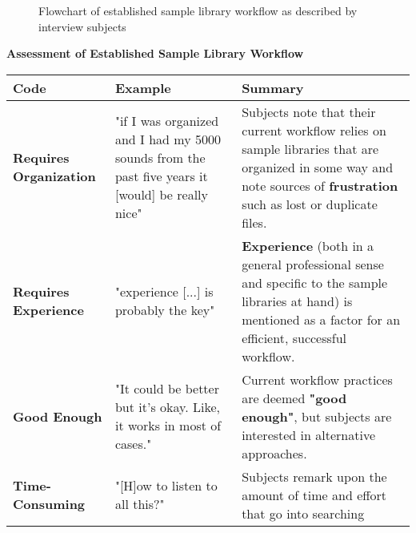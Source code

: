 \begin{figure}[!htb]
\caption[Established sample library workflow]{Flowchart of established sample
library workflow as described by interview subjects}
\label{table:results_current_workflow}
\end{figure}

\begin{table}[!ht]
  \textbf{Assessment of Established Sample Library Workflow}
  \renewcommand{\arraystretch}{1.2}
  \centering
  \footnotesize
  \begin{tabular}{ p{4.0cm} p{4.75cm} p{4.75cm} }
  \hline
    \textbf{Code} & \textbf{Example} & \textbf{Summary} \\
    \hline
    \textbf{Requires Organization}
    &
    "if I was organized and I had my 5000 sounds from the past five years it
    [would] be really nice"
    &
    Subjects note that their current workflow relies on sample libraries that
    are organized in some way and note sources of \textbf{frustration} such as
    lost or duplicate files.
    \\
    \textbf{Requires Experience}
    &
    "experience [...] is probably the key"
    &
    \textbf{Experience} (both in a general professional sense and specific to
    the sample libraries at hand) is mentioned as a factor for an efficient,
    successful workflow.
    \\
    \textbf{Good Enough}
    &
    "It could be better but it's okay. Like, it works in most of cases."
    &
    Current workflow practices are deemed \textbf{"good enough"}, but subjects
    are interested in alternative approaches.
    \\
    \textbf{Time-Consuming}
    &
    "[H]ow to listen to all this?"
    &
    Subjects remark upon the amount of time and effort that go into searching

\end{tabular}
\end{table}
